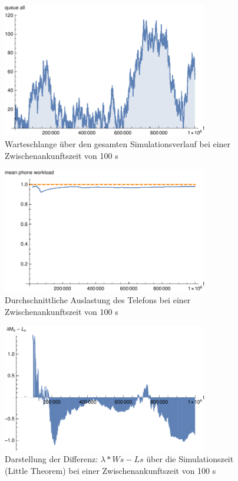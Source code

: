 \begin{figure}[htpb]
	\centering
	\includegraphics[width=0.8\textwidth]{abbildungen/1_Phone_VIP/Arrival_100_Serve_100_dur_1000000_Skip_0/QueueStepPlotAllFiltered.pdf}
	\caption{Warteschlange über den gesamten Simulationsverlauf bei einer Zwischenankunftszeit von 100 s}
	\label{fig:1_Phone_VIP_100_QueuePlot_All}
\end{figure} 



\begin{figure}[htpb]
	\centering
	\includegraphics[width=0.8\textwidth]{abbildungen/1_Phone_VIP/Arrival_100_Serve_100_dur_1000000_Skip_0/MeanPhoneWorkload.pdf}
	\caption{Durchschnittliche Auslastung des Telefons bei einer Zwischenankunftszeit von 100 s}
	\label{fig:1_Phone_VIP_100_WorkLoad}
\end{figure} 



\begin{figure}[htpb]
	\centering
	\includegraphics[width=0.8\textwidth]{abbildungen/1_Phone_VIP/Arrival_100_Serve_100_dur_1000000_Skip_0/LittleSystem.pdf}
	\caption{Darstellung der Differenz: $\lambda * Ws - Ls$ über die Simulationszeit (Little Theorem) bei einer Zwischenankunftszeit von 100 s}
	\label{fig:1_Phone_VIP_100_Little}
\end{figure} 


